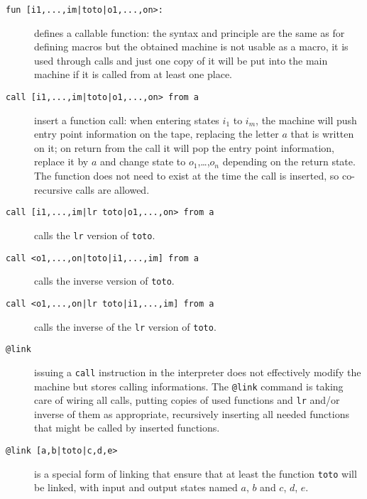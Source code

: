 \documentclass[a4paper,11pt]{article}
\theoremstyle{remark}
\begin{document}
\begin{description}
		\item[\texttt{fun [i1,...,im|toto|o1,...,on>:}] defines a callable function: the syntax
		and principle are the same as for defining macros but the obtained machine is not usable
		as a macro, it is used through calls and just one copy of it will be put into the main machine
		if it is called from at least one place.
		\item[\texttt{call [i1,...,im|toto|o1,...,on> from a}] insert a function call: when entering
		states $i_1$ to $i_m$, the machine will push entry point information on the tape, replacing
		the letter $a$ that is written on it; on return from the call it will pop the entry point
		information, replace it by $a$ and change state to $o_1$,\ldots,$o_n$ depending on the return
		state. The function does not need to exist at the time the call is inserted, so co-recursive
		calls are allowed.
		\item[\texttt{call [i1,...,im|lr toto|o1,...,on> from a}] calls the \texttt{lr} version of \texttt{toto}.
		\item[\texttt{call <o1,...,on|toto|i1,...,im] from a}] calls the inverse version of \texttt{toto}.
		\item[\texttt{call <o1,...,on|lr toto|i1,...,im] from a}] calls the inverse of the \texttt{lr} version of \texttt{toto}.
		\item[\texttt{@link}] issuing a \texttt{call} instruction in the interpreter does not effectively
		modify the machine but stores calling informations. The \texttt{@link} command is taking care
		of wiring all calls, putting copies of used functions and \texttt{lr} and/or inverse of
		them as appropriate, recursively inserting all needed functions that might be called by inserted
		functions.
		\item[\texttt{@link [a,b|toto|c,d,e>}] is a special form of linking that ensure that at least the
		function \texttt{toto} will be linked, with input and output states named $a$, $b$ and
		$c$, $d$, $e$.
\end{description}
\end{document}
